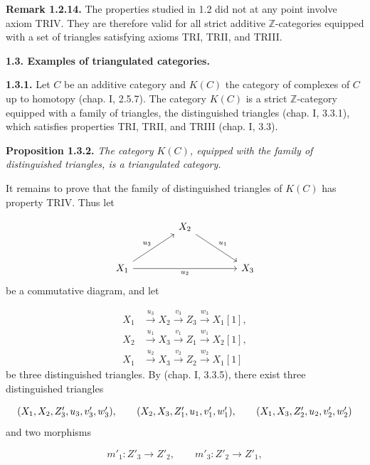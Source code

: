 \clearpage
{}%
\begingroup
\small
\setlength{\emergencystretch}{1.5em}%
\setlength{\abovedisplayskip}{4pt plus 2pt minus 2pt}%
\setlength{\belowdisplayskip}{4pt plus 2pt minus 2pt}%

\noindent\textbf{Remark 1.2.14.}\quad
The properties studied in 1.2 did not at any point involve axiom TRIV. They
are therefore valid for all strict additive $\mathbb Z$-categories equipped
with a set of triangles satisfying axioms TRI, TRII, and TRIII.

\medskip
\noindent\textbf{1.3. Examples of triangulated categories.}

\medskip
\noindent\textbf{1.3.1.}\quad
Let $C$ be an additive category and $K(C)$ the category of complexes of $C$
up to homotopy (chap. I, 2.5.7). The category $K(C)$ is a strict
$\mathbb Z$-category equipped with a family of triangles, the distinguished
triangles (chap. I, 3.3.1), which satisfies properties TRI, TRII, and TRIII
(chap. I, 3.3).

\medskip
\noindent\textbf{Proposition 1.3.2.}\quad
\textit{The category $K(C)$, equipped with the family of distinguished
triangles, is a triangulated category.}

It remains to prove that the family of distinguished triangles of $K(C)$
has property TRIV. Thus let

\[
  \begin{tikzcd}[column sep=4.2em,row sep=2.6em]
    & X_2 \arrow[dr,"u_1"] & \\
    X_1 \arrow[ur,"u_3"] \arrow[rr,"u_2"'] && X_3
  \end{tikzcd}
\]
\noindent be a commutative diagram, and let

\[
  \begin{aligned}
    X_1&\xrightarrow{u_3}X_2\xrightarrow{v_3}Z_3
      \xrightarrow{w_3}X_1[1],\\
    X_2&\xrightarrow{u_1}X_3\xrightarrow{v_1}Z_1
      \xrightarrow{w_1}X_2[1],\\
    X_1&\xrightarrow{u_2}X_3\xrightarrow{v_2}Z_2
      \xrightarrow{w_2}X_1[1]
  \end{aligned}
\]
\noindent be three distinguished triangles. By (chap. I, 3.3.5), there
exist three distinguished triangles

\[
  \resizebox{0.98\linewidth}{!}{$
    (X_1,X_2,Z'_3,u_3,v'_3,w'_3),\qquad
    (X_2,X_3,Z'_1,u_1,v'_1,w'_1),\qquad
    (X_1,X_3,Z'_2,u_2,v'_2,w'_2)
  $}
\]
\noindent and two morphisms

\[
  m'_1\colon Z'_3\longrightarrow Z'_2,\qquad
  m'_3\colon Z'_2\longrightarrow Z'_1,
\]
\endgroup
